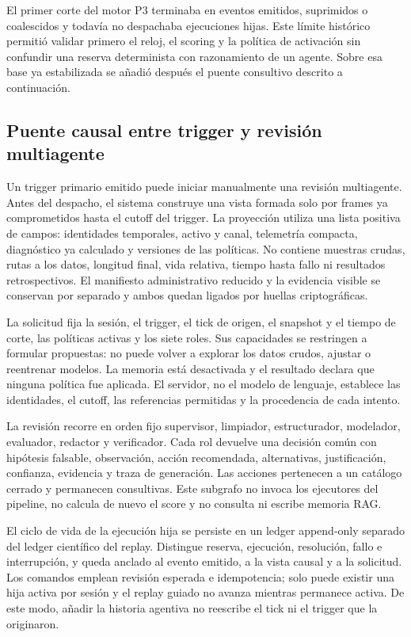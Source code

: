 El primer corte del motor P3 terminaba en eventos emitidos, suprimidos o
coalescidos y todavía no despachaba ejecuciones hijas. Este límite histórico
permitió validar primero el reloj, el scoring y la política de activación sin
confundir una reserva determinista con razonamiento de un agente. Sobre esa
base ya estabilizada se añadió después el puente consultivo descrito a
continuación.

\subsection{Puente causal entre trigger y revisión multiagente}

Un trigger primario emitido puede iniciar manualmente una revisión
multiagente. Antes del despacho, el sistema construye una vista formada solo
por frames ya comprometidos hasta el cutoff del trigger. La proyección utiliza
una lista positiva de campos: identidades temporales, activo y canal,
telemetría compacta, diagnóstico ya calculado y versiones de las políticas.
No contiene muestras crudas, rutas a los datos, longitud final, vida relativa,
tiempo hasta fallo ni resultados retrospectivos. El manifiesto administrativo
reducido y la evidencia visible se conservan por separado y ambos quedan
ligados por huellas criptográficas.

La solicitud fija la sesión, el trigger, el tick de origen, el snapshot y el
tiempo de corte, las políticas activas y los siete roles. Sus capacidades se
restringen a formular propuestas: no puede volver a explorar los datos crudos,
ajustar o reentrenar modelos. La memoria está desactivada y el resultado declara
que ninguna política fue aplicada. El servidor, no el modelo de lenguaje,
establece las identidades, el cutoff, las referencias permitidas y la
procedencia de cada intento.

La revisión recorre en orden fijo supervisor, limpiador, estructurador,
modelador, evaluador, redactor y verificador. Cada rol devuelve una decisión
común con hipótesis falsable, observación, acción recomendada, alternativas,
justificación, confianza, evidencia y traza de generación. Las acciones
pertenecen a un catálogo cerrado y permanecen consultivas. Este subgrafo no
invoca los ejecutores del pipeline, no calcula de nuevo el score y no consulta
ni escribe memoria RAG.

El ciclo de vida de la ejecución hija se persiste en un ledger append-only
separado del ledger científico del replay. Distingue reserva, ejecución,
resolución, fallo e interrupción, y queda anclado al evento emitido, a la vista
causal y a la solicitud. Los comandos emplean revisión esperada e idempotencia;
solo puede existir una hija activa por sesión y el replay guiado no avanza
mientras permanece activa. De este modo, añadir la historia agentiva no
reescribe el tick ni el trigger que la originaron.

